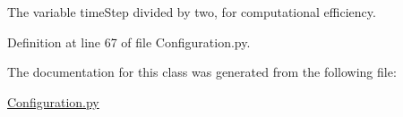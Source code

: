 The variable time\+Step divided by two, for computational efficiency. 



Definition at line 67 of file Configuration.\+py.



The documentation for this class was generated from the following file\+:\begin{DoxyCompactItemize}
\item 
\hyperlink{_configuration_8py}{Configuration.\+py}\end{DoxyCompactItemize}
